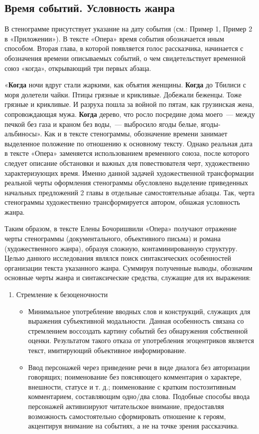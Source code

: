 \documentclass{kursa4}
\begin{document}
{      \subsection{Время событий. Условность жанра}

        В стенограмме присутствует указание на дату события (см.: Пример 1, Пример 2 в «Приложении»). В тексте «Опера» время события обозначается иным способом. Вторая глава, в которой появляется голос рассказчика, начинается с обозначения времени описываемых событий, о чем свидетельствует временной союз «когда», открывающий три первых абзаца. 

        «\textbf{Когда} ночи вдруг стали жаркими, как объятия женщины. \textbf{Когда} до Тбилиси с моря долетели чайки. Птицы грязные и крикливые. Добежали беженцы. Тоже грязные и крикливые. И разруха пошла за войной по пятам, как грузинская жена, сопровождающая мужа. \textbf{Когда} дерево, что росло посредине дома моего~--- между печкой без газа и краном без воды,~--- выбросило ягоды белые, ягоды-альбиносы». Как и в тексте стенограммы, обозначение времени занимает выделенное положение по отношению к основному тексту. Однако реальная дата в тексте «Опера» заменяется использованием временного союза, после которого следует описание обстановки и важных для повествователя черт, художественно характеризующих время. Именно данной задачей художественной трансформации реальной черты оформления стенограммы обусловлено выделение приведенных начальных предложений 2 главы в отдельные самостоятельные абзацы. Так, черта стенограммы художественно трансформируется автором, обнажая условность жанра. 

  Таким образом, в тексте Елены Бочоришвили «Опера» получают отражение черты стенограммы (документального, объективного письма) и романа (художественного жанра), образуя сложную, контаминированную структуру. Целью данного исследования являлся поиск синтаксических особенностей организации текста указанного жанра. Суммируя полученные выводы, обозначим основные черты жанра и синтаксические средства, служащие для их выражения:  

  \begin{enumerate}
    \item{Стремление к безоценочности}
    \begin{itemize}
      \item{Минимальное употребление вводных слов и конструкций, служащих для выражения субъективной модальности. Данная особенность связана со стремлением воссоздать картину событий без обнаружения собственной оценки. Результатом такого отказа от употребления эгоцентриков является текст, имитирующий объективное информирование.} 
      \item{Ввод персонажей через приведение речи в виде диалога без авторизации говорящих; поименование без поясняющего комментария о характере, внешности, статусе и т. д.; поименование с кратким постозитивным комментарием, составляющим одно/два слова. Подобные способы ввода персонажей активизируют читательское внимание, предоставляя возможность самостоятельно сформировать отношение к героям, акцентируя внимание на событиях, а не на точке зрения рассказчика.}
    \end{itemize}


\end{enumerate}}
\end{document}
